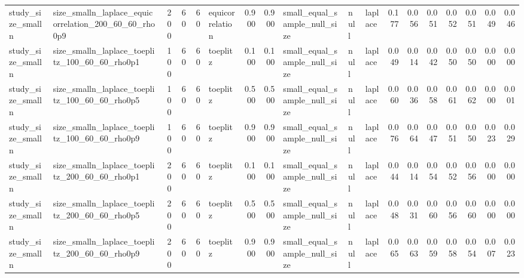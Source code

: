 \begin{tabular}{llrrrlrrlllrrrrrrr}
study\_size\_smalln & size\_smalln\_laplace\_equicorrelation\_200\_60\_60\_rho0p9 & 200 & 60 & 60 & equicorrelation & 0.900 & 0.900 & small\_equal\_sample\_null\_size & null & laplace & 0.177 & 0.056 & 0.051 & 0.052 & 0.051 & 0.049 & 0.046 \\
study\_size\_smalln & size\_smalln\_laplace\_toeplitz\_100\_60\_60\_rho0p1 & 100 & 60 & 60 & toeplitz & 0.100 & 0.100 & small\_equal\_sample\_null\_size & null & laplace & 0.049 & 0.014 & 0.042 & 0.050 & 0.050 & 0.000 & 0.000 \\
study\_size\_smalln & size\_smalln\_laplace\_toeplitz\_100\_60\_60\_rho0p5 & 100 & 60 & 60 & toeplitz & 0.500 & 0.500 & small\_equal\_sample\_null\_size & null & laplace & 0.060 & 0.036 & 0.058 & 0.061 & 0.062 & 0.000 & 0.001 \\
study\_size\_smalln & size\_smalln\_laplace\_toeplitz\_100\_60\_60\_rho0p9 & 100 & 60 & 60 & toeplitz & 0.900 & 0.900 & small\_equal\_sample\_null\_size & null & laplace & 0.076 & 0.064 & 0.047 & 0.051 & 0.050 & 0.023 & 0.029 \\
study\_size\_smalln & size\_smalln\_laplace\_toeplitz\_200\_60\_60\_rho0p1 & 200 & 60 & 60 & toeplitz & 0.100 & 0.100 & small\_equal\_sample\_null\_size & null & laplace & 0.044 & 0.014 & 0.054 & 0.052 & 0.056 & 0.000 & 0.000 \\
study\_size\_smalln & size\_smalln\_laplace\_toeplitz\_200\_60\_60\_rho0p5 & 200 & 60 & 60 & toeplitz & 0.500 & 0.500 & small\_equal\_sample\_null\_size & null & laplace & 0.048 & 0.031 & 0.060 & 0.056 & 0.060 & 0.000 & 0.000 \\
study\_size\_smalln & size\_smalln\_laplace\_toeplitz\_200\_60\_60\_rho0p9 & 200 & 60 & 60 & toeplitz & 0.900 & 0.900 & small\_equal\_sample\_null\_size & null & laplace & 0.065 & 0.063 & 0.059 & 0.058 & 0.054 & 0.007 & 0.023 \\
\bottomrule
\end{tabular}

